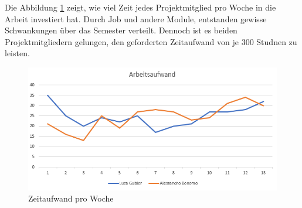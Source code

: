 Die Abbildung \ref{time_per_Week} zeigt, wie viel Zeit jedes Projektmitglied pro Woche in die Arbeit investiert hat. Durch Job und andere Module, entstanden gewisse Schwankungen über das Semester verteilt. Dennoch ist es beiden Projektmitgliedern gelungen, den geforderten Zeitaufwand von je 300 Studnen zu leisten.

\begin{minipage}{\textwidth}
	\begin{figure}[H]
		\includegraphics[width=\textwidth, height=\textheight, keepaspectratio]{images/Zeitauswertung/Aufwand_Wochen.png}
		\caption{Zeitaufwand pro Woche}
		\label{time_per_Week}
	\end{figure}
\end{minipage}


